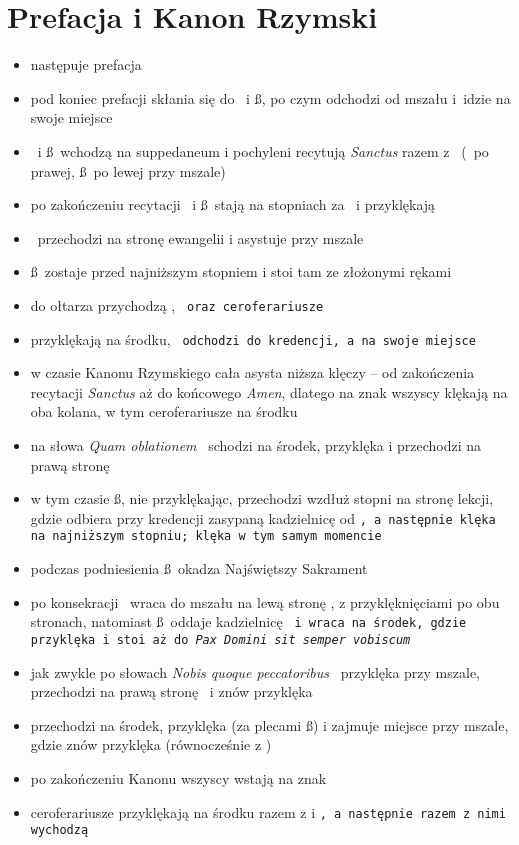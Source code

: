 \section{Prefacja i Kanon Rzymski}

\begin{itemize}
	\item następuje prefacja
	\item pod koniec prefacji  skłania się do \dd~i \ss, po czym odchodzi od
		mszału i idzie na swoje miejsce
	\item \dd~i \ss~wchodzą na suppedaneum i pochyleni recytują \textit{Sanctus}
		razem z \ii~(\dd~po prawej, \ss~po lewej przy mszale)
	\item po zakończeniu recytacji \dd~i \ss~stają na stopniach za \ii~i
		przyklękają
	\item \dd~przechodzi na stronę ewangelii i asystuje przy mszale
	\item \ss~zostaje przed najniższym stopniem i stoi tam ze złożonymi rękami
	\item do ołtarza przychodzą , \tt~oraz ceroferariusze
	\item przyklękają na środku, \tt~odchodzi do kredencji, a  na swoje
		miejsce
	\item w czasie Kanonu Rzymskiego cała asysta niższa klęczy – od
		zakończenia recytacji \textit{Sanctus} aż do końcowego
		\textit{Amen}, dlatego na znak  wszyscy klękają na oba
		kolana, w tym ceroferariusze na środku \item na słowa \textit{Quam
		oblationem} \dd~schodzi na środek, przyklęka i przechodzi na
		prawą stronę \ii
	\item w tym czasie \ss, nie przyklękając, przechodzi wzdłuż stopni na
		stronę lekcji, gdzie odbiera przy kredencji zasypaną
		kadzielnicę od \tt, a następnie klęka na najniższym stopniu; 
		klęka w tym samym momencie
	\item podczas podniesienia \ss~okadza Najświętszy Sakrament
	\item po konsekracji \dd~wraca do mszału na lewą stronę \ii, z
		przyklęknięciami po obu stronach, natomiast \ss~oddaje
		kadzielnicę \tt~i wraca na środek, gdzie przyklęka i stoi aż do
		\textit{Pax Domini sit semper vobiscum}
	\item jak zwykle po słowach \textit{Nobis quoque peccatoribus} \dd~przyklęka przy
		mszale, przechodzi na prawą stronę \ii~i znów przyklęka
	\item {} przechodzi na środek, przyklęka (za plecami \ss) i zajmuje
		miejsce przy mszale, gdzie znów przyklęka (równocześnie z \dd)
	\item po zakończeniu Kanonu wszyscy wstają na znak 
	\item ceroferariusze przyklękają na środku razem z  i \tt, a następnie
		razem z nimi wychodzą
\end{itemize}


